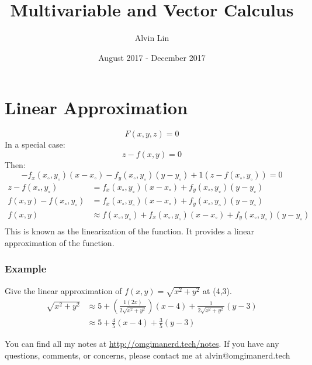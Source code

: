 \documentclass[letterpaper, 12pt]{math}
\title{Multivariable and Vector Calculus}
\author{Alvin Lin}
\date{August 2017 - December 2017}
\begin{document}
\maketitle

\section*{Linear Approximation}
\[ F(x,y,z) = 0 \]
In a special case:
\[ z-f(x,y) = 0 \]
Then:
\[ -f_x(x_{\circ},y_{\circ})(x-x_{\circ})-f_y(x_{\circ},y_{\circ})(y-y_{\circ})+
  1(z-f(x_{\circ},y_{\circ})) = 0 \]
\begin{align*}
  z-f(x_{\circ},y_{\circ}) &= f_x(x_{\circ},y_{\circ})(x-x_{\circ})+
    f_y(x_{\circ},y_{\circ})(y-y_{\circ}) \\
  f(x,y)-f(x_{\circ},y_{\circ}) &= f_x(x_{\circ},y_{\circ})(x-x_{\circ})+
    f_y(x_{\circ},y_{\circ})(y-y_{\circ}) \\
  f(x,y) &\approx f(x_{\circ},y_{\circ})+f_x(x_{\circ},y_{\circ})(x-x_{\circ})+
    f_y(x_{\circ},y_{\circ})(y-y_{\circ}) \\
\end{align*}
This is known as the linearization of the function. It provides a linear
approximation of the function.

\subsubsection*{Example}
Give the linear approximation of \( f(x,y) = \sqrt{x^2+y^2} \) at (4,3).
\begin{align*}
  \sqrt{x^2+y^2} &\approx 5+(\frac{1(2x)}{2\sqrt{x^2+y^2}})(x-4)+
    \frac{1}{2\sqrt{x^2+y^2}}(y-3) \\
  &\approx 5+\frac{4}{5}(x-4)+\frac{3}{5}(y-3)
\end{align*}

\begin{center}
  You can find all my notes at \url{http://omgimanerd.tech/notes}. If you have
  any questions, comments, or concerns, please contact me at
  alvin@omgimanerd.tech
\end{center}
\end{document}
